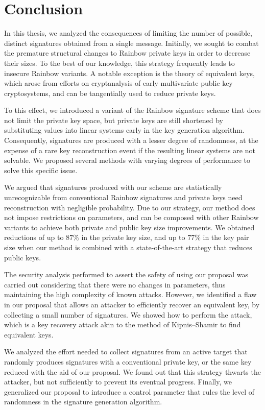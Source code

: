 \documentclass[12pt, a4paper, oneside]{memoir}
\theoremstyle{definition}
\begin{document}
\chapter{Conclusion}\label{ch:conc}

In this thesis, we analyzed the consequences of limiting the number of possible, distinct signatures obtained from a single message. Initially, we sought to combat the premature structural changes to Rainbow private keys in order to decrease their sizes. To the best of our knowledge, this strategy frequently leads to insecure Rainbow variants. A notable exception is the theory of equivalent keys, which arose from efforts on cryptanalysis of early multivariate public key cryptosystems, and can be tangentially used to reduce private keys.

To this effect, we introduced a variant of the Rainbow signature scheme that does not limit the private key space, but private keys are still shortened by substituting values into linear systems early in the key generation algorithm. Consequently, signatures are produced with a lesser degree of randomness, at the expense of a rare key reconstruction event if the resulting linear systems are not solvable. We proposed several methods with varying degrees of performance to solve this specific issue.

We argued that signatures produced with our scheme are statistically unrecognizable from conventional Rainbow signatures and private keys need reconstruction with negligible probability. Due to our strategy, our method does not impose restrictions on parameters, and can be composed with other Rainbow variants to achieve both private and public key size improvements. We obtained reductions of up to $87\%$ in the private key size, and up to $77\%$ in the key pair size when our method is combined with a state-of-the-art strategy that reduces public keys.

The security analysis performed to assert the safety of using our proposal was carried out considering that there were no changes in parameters, thus maintaining the high complexity of known attacks. However, we identified a flaw in our proposal that allows an attacker to efficiently recover an equivalent key, by collecting a small number of signatures. We showed how to perform the attack, which is a key recovery attack akin to the method of Kipnis--Shamir to find equivalent keys.

We analyzed the effort needed to collect signatures from an active target that randomly produces signatures with a conventional private key, or the same key reduced with the aid of our proposal. We found out that this strategy thwarts the attacker, but not sufficiently to prevent its eventual progress. Finally, we generalized our proposal to introduce a control parameter that rules the level of randomness in the signature generation algorithm. 
\end{document}
